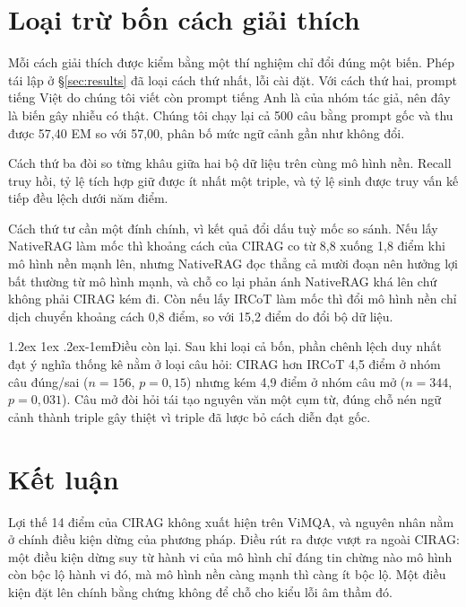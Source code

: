 \documentclass[11pt]{article}
\makeatletter
\renewcommand\paragraph{\@startsection{paragraph}{4}{\z@}%
  {1.2ex \@plus1ex \@minus.2ex}{-1em}{\normalfont\normalsize\bfseries}}
\makeatother
\begin{document}
\section{Loại trừ bốn cách giải thích}
\label{sec:backbone}

Mỗi cách giải thích được kiểm bằng một thí nghiệm chỉ đổi đúng một biến. Phép tái lập ở
\S\ref{sec:results} đã loại cách thứ nhất, lỗi cài đặt. Với cách thứ hai, prompt tiếng Việt
do chúng tôi viết còn prompt tiếng Anh là của nhóm tác giả, nên đây là biến gây nhiễu có
thật. Chúng tôi chạy lại cả 500 câu bằng prompt gốc và thu được 57,40 EM so với 57,00, phân bố mức ngữ cảnh
gần như không đổi.

Cách thứ ba đòi so từng khâu giữa hai bộ dữ liệu trên cùng mô hình nền. Recall truy hồi, tỷ
lệ tích hợp giữ được ít nhất một triple, và tỷ lệ sinh được truy vấn kế tiếp đều lệch dưới
năm điểm.

Cách thứ tư cần một đính chính, vì kết quả đổi dấu tuỳ mốc so sánh. Nếu lấy NativeRAG làm
mốc thì khoảng cách của CIRAG co từ 8,8 xuống 1,8 điểm khi mô hình nền mạnh lên, nhưng NativeRAG
đọc thẳng cả mười đoạn nên hưởng lợi bất thường từ mô hình mạnh, và chỗ co lại phản ánh
NativeRAG khá lên chứ không phải CIRAG kém đi. Còn nếu lấy IRCoT làm mốc thì đổi mô hình nền chỉ dịch
chuyển khoảng cách 0,8 điểm, so với 15,2 điểm do đổi bộ dữ liệu.

\paragraph{Điều còn lại.} Sau khi loại cả bốn, phần chênh lệch duy nhất đạt ý nghĩa thống kê
nằm ở loại câu hỏi: CIRAG hơn IRCoT 4,5 điểm ở nhóm câu đúng/sai ($n = 156$,
$p = 0{,}15$) nhưng kém 4,9 điểm ở nhóm câu mở ($n = 344$, $p = 0{,}031$). Câu mở đòi hỏi tái
tạo nguyên văn một cụm từ, đúng chỗ nén ngữ cảnh thành triple gây thiệt vì triple đã lược bỏ
cách diễn đạt gốc.

\section{Kết luận}
\label{sec:conclusion}

Lợi thế 14 điểm của CIRAG không xuất hiện trên ViMQA, và nguyên nhân nằm ở chính điều kiện
dừng của phương pháp. Điều rút ra được vượt ra ngoài CIRAG: một điều kiện dừng suy từ hành
vi của mô hình chỉ đáng tin chừng nào mô hình còn bộc lộ hành vi đó, mà mô hình nền càng
mạnh thì càng ít bộc lộ. Một điều kiện đặt lên chính bằng chứng không để chỗ cho kiểu lỗi
âm thầm đó.
\end{document}
